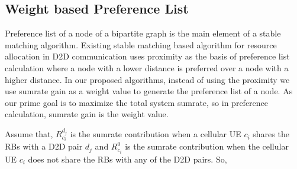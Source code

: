 \documentclass[times]{dacauth}
\begin{document}




\subsection{Weight based Preference List} \label{preference list}


\noindent
Preference list of a node of a bipartite graph is the main element of a stable matching algorithm. Existing stable matching based algorithm \cite{dara} for resource allocation in D2D communication uses proximity as the basis of preference list calculation where a node with a lower distance is preferred over a node with a higher distance. In our proposed algorithms, instead of using the proximity we use sumrate gain as a  weight value to generate the preference list of a node. As our prime goal is to maximize the total system sumrate, so in preference calculation, sumrate gain is the weight value. 

\smallskip

\noindent
Assume that, $R_{c_i}^{d_j}$ is the sumrate contribution when a cellular UE $c_i$ shares the RBs with a D2D pair $d_j$ and $R_{c_i}^{0}$ is the sumrate contribution when the cellular UE $c_i$ does not share the RBs with any of the D2D pairs. So,
\end{document}

